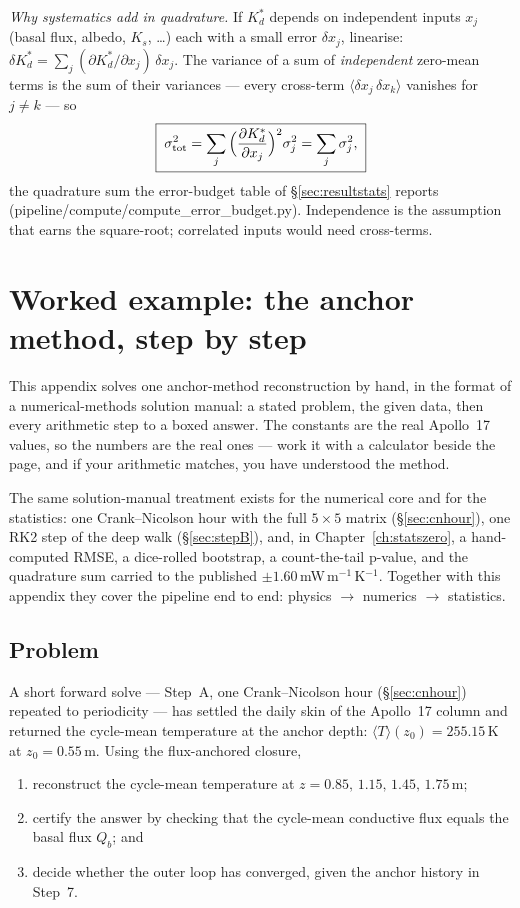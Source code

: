 \documentclass[11pt]{report}
\newcommand{\Tm}{\langle T\rangle}
\newcommand{\code}[1]{{\ttfamily\small #1}}
\begin{document}
\emph{Why systematics add in quadrature.} If $K_d^{*}$ depends on independent
inputs $x_j$ (basal flux, albedo, $K_s$, \ldots) each with a small error
$\delta x_j$, linearise: $\delta K_d^{*}=\sum_j(\partial K_d^{*}/\partial x_j)\,
\delta x_j$. The variance of a sum of \emph{independent} zero-mean terms is the
sum of their variances --- every cross-term $\langle\delta x_j\,\delta
x_k\rangle$ vanishes for $j\neq k$ --- so
\[
\boxed{\;\sigma_{\rm tot}^2=\sum_j\Big(\frac{\partial K_d^{*}}{\partial x_j}\Big)^2
\sigma_j^2=\sum_j\sigma_j^2,\;}
\]
the quadrature sum the error-budget table of \S\ref{sec:resultstats} reports
(\code{pipeline/compute/compute\_error\_budget.py}). Independence is the
assumption that earns the square-root; correlated inputs would need cross-terms.

\chapter{Worked example: the anchor method, step by step}\label{app:worked}

\begin{plain}
This appendix solves one anchor-method reconstruction by hand, in the format of a
numerical-methods solution manual: a stated problem, the given data, then every
arithmetic step to a boxed answer. The constants are the real Apollo~17 values, so
the numbers are the real ones --- work it with a calculator beside the page, and if
your arithmetic matches, you have understood the method.
\end{plain}

\noindent The same solution-manual treatment exists for the numerical core and
for the statistics: one Crank--Nicolson hour with the full $5\times5$ matrix
(\S\ref{sec:cnhour}), one RK2 step of the deep walk (\S\ref{sec:stepB}), and,
in Chapter~\ref{ch:statszero}, a hand-computed RMSE, a dice-rolled bootstrap,
a count-the-tail p-value, and the quadrature sum carried to the published
$\pm1.60$\,mW\,m$^{-1}$\,K$^{-1}$. Together with this appendix they cover the
pipeline end to end: physics $\rightarrow$ numerics $\rightarrow$ statistics.

\section{Problem}
A short forward solve --- Step~A, one Crank--Nicolson hour (\S\ref{sec:cnhour})
repeated to periodicity --- has settled the daily skin of the Apollo~17 column and
returned the cycle-mean temperature at the anchor depth: $\Tm(z_0)=255.15$\,K at
$z_0=0.55$\,m. Using the flux-anchored closure,
\begin{enumerate}[label=\textbf{(\alph*)},leftmargin=2.2em,itemsep=1pt]
\item reconstruct the cycle-mean temperature at $z=0.85,\,1.15,\,1.45,\,1.75$\,m;
\item certify the answer by checking that the cycle-mean conductive flux equals the
  basal flux $Q_b$; and
\item decide whether the outer loop has converged, given the anchor history in
  Step~7.
\end{enumerate}
\end{document}
